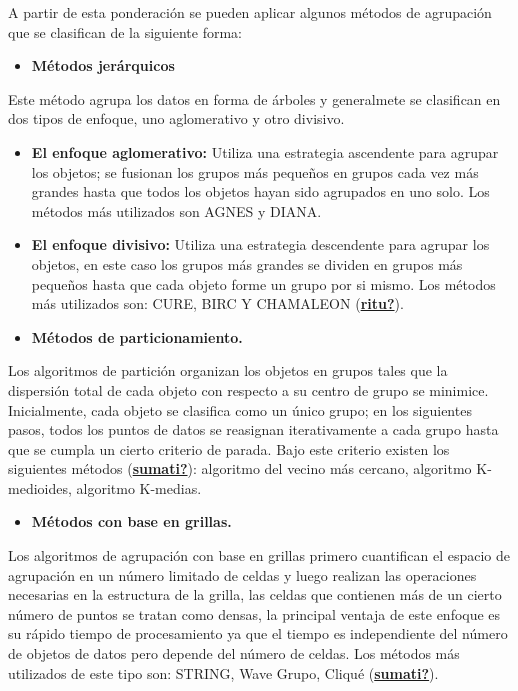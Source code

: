 \documentclass[
]{book}
\providecommand{\tightlist}{%
  \setlength{\itemsep}{0pt}\setlength{\parskip}{0pt}}
\begin{document}
A partir de esta ponderación se pueden aplicar algunos métodos de agrupación que se clasifican de la siguiente forma:

\begin{itemize}
\tightlist
\item
  \textbf{Métodos jerárquicos}
\end{itemize}

Este método agrupa los datos en forma de árboles y generalmete se clasifican en dos tipos de enfoque, uno aglomerativo y otro divisivo.

\begin{itemize}
\item
  \textbf{El enfoque aglomerativo:}
  Utiliza una estrategia ascendente para agrupar los objetos; se fusionan los grupos más pequeños en grupos cada vez más grandes hasta que todos los objetos hayan sido agrupados en uno solo. Los métodos más utilizados son AGNES y DIANA.
\item
  \textbf{El enfoque divisivo:}
  Utiliza una estrategia descendente para agrupar los objetos, en este caso los grupos más grandes se dividen en grupos más pequeños hasta que cada objeto forme un grupo por si mismo. Los métodos más utilizados son: CURE, BIRC Y CHAMALEON (\protect\hyperlink{ref-ritu}{\textbf{ritu?}}).
\item
  \textbf{Métodos de particionamiento.}
\end{itemize}

Los algoritmos de partición organizan los objetos en grupos tales que la dispersión total de cada objeto con respecto a su centro de grupo se minimice. Inicialmente, cada objeto se clasifica como un único grupo; en los siguientes pasos, todos los puntos de datos se reasignan iterativamente a cada grupo hasta que se cumpla un cierto criterio de parada. Bajo este criterio existen los siguientes métodos (\protect\hyperlink{ref-sumati}{\textbf{sumati?}}): algoritmo del vecino más cercano, algoritmo K-medioides, algoritmo K-medias.

\begin{itemize}
\tightlist
\item
  \textbf{Métodos con base en grillas.}
\end{itemize}

Los algoritmos de agrupación con base en grillas primero cuantifican el espacio de agrupación en un número limitado de celdas y luego realizan las operaciones necesarias en la estructura de la grilla, las celdas que contienen más de un cierto número de puntos se tratan como densas, la principal ventaja de este enfoque es su rápido tiempo de procesamiento ya que el tiempo es independiente del número de objetos de datos pero depende del número de celdas. Los métodos más utilizados de este tipo son: STRING, Wave Grupo, Cliqué (\protect\hyperlink{ref-sumati}{\textbf{sumati?}}).
\end{document}
